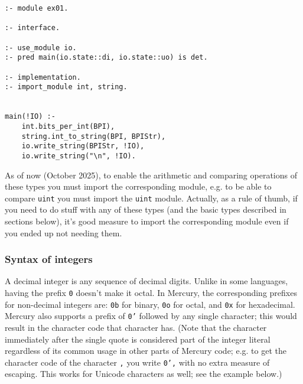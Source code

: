\begin{lstlisting}[language=Mercury]
:- module ex01.

:- interface.

:- use_module io.
:- pred main(io.state::di, io.state::uo) is det.

:- implementation.
:- import_module int, string.


main(!IO) :-
    int.bits_per_int(BPI),
	string.int_to_string(BPI, BPIStr),
	io.write_string(BPIStr, !IO),
	io.write_string("\n", !IO).
\end{lstlisting}


As of now (October 2025), to enable the arithmetic and comparing operations of these types you must import the corresponding module, e.g. to be able to compare \texttt{uint} you must import the \texttt{uint} module. Actually, as a rule of thumb, if you need to do stuff with any of these types (and the basic types described in sections below), it's good measure to import the corresponding module even if you ended up not needing them.

\subsubsection{Syntax of integers}

A decimal integer is any sequence of decimal digits. Unlike in some languages, having the prefix \texttt{0} doesn't make it octal. In Mercury, the corresponding prefixes for non-decimal integers are: \texttt{0b} for binary, \texttt{0o} for octal, and \texttt{0x} for hexadecimal. Mercury also supports a prefix of \texttt{0'} followed by any single character; this would result in the character code that character has. (Note that the character immediately after the single quote is considered part of the integer literal regardless of its common usage in other parts of Mercury code; e.g. to get the character code of the character \texttt{,} you write \texttt{0',} with no extra measure of escaping. This works for Unicode characters as well; see the example below.)

